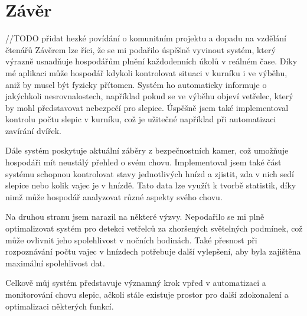 ﻿\setlength{\parindent}{0pt}

\newpage
\chapter{Závěr}\label{ch:zaver}
//TODO přidat hezké povídání o komunitním projektu a dopadu na vzdělání čtenářů\newline
Závěrem lze říci, že se mi podařilo úspěšně vyvinout systém, který výrazně usnadňuje hospodářům plnění každodenních úkolů v reálném čase.
Díky mé aplikaci může hospodář kdykoli kontrolovat situaci v kurníku i ve výběhu, aniž by musel být fyzicky přítomen.
Systém ho automaticky informuje o jakýchkoli nesrovnalostech, například pokud se ve výběhu objeví vetřelec, který by mohl představovat nebezpečí pro slepice.
Úspěšně jsem také implementoval kontrolu počtu slepic v kurníku, což je užitečné například při automatizaci zavírání dvířek.

Dále systém poskytuje aktuální záběry z bezpečnostních kamer, což umožňuje hospodáři mít neustálý přehled o svém chovu.
Implementoval jsem také část systému schopnou kontrolovat stavy jednotlivých hnízd a zjistit, zda v nich sedí slepice nebo kolik vajec je v hnízdě.
Tato data lze využít k tvorbě statistik, díky nimž může hospodář analyzovat různé aspekty svého chovu.

Na druhou stranu jsem narazil na některé výzvy.
Nepodařilo se mi plně optimalizovat systém pro detekci vetřelců za zhoršených světelných podmínek, což může ovlivnit jeho spolehlivost v nočních hodinách.
Také přesnost při rozpoznávání počtu vajec v hnízdech potřebuje další vylepšení, aby byla zajištěna maximální spolehlivost dat.

Celkově můj systém představuje významný krok vpřed v automatizaci a monitorování chovu slepic, ačkoli stále existuje prostor pro další zdokonalení a optimalizaci některých funkcí.






